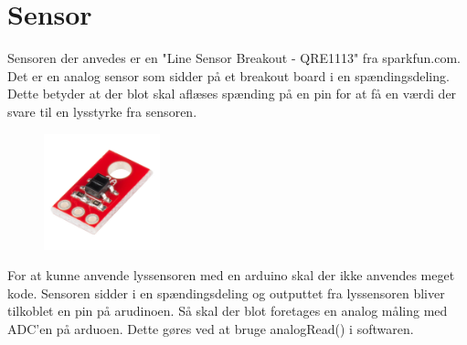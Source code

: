 \section{Sensor}
Sensoren der anvedes er en "Line Sensor Breakout - QRE1113" fra sparkfun.com. Det er en analog sensor som sidder på et breakout board i en spændingsdeling. Dette betyder at der blot skal aflæses spænding på en pin for at få en værdi der svare til en lysstyrke fra sensoren.

\begin{figure}[h!]
  \centering
  \includegraphics[width=0.3\textwidth]{figures/lyssensor.png}
\end{figure}

For at kunne anvende lyssensoren med en arduino skal der ikke anvendes meget kode. Sensoren sidder i en spændingsdeling og outputtet fra lyssensoren bliver tilkoblet en pin på arudinoen. Så skal der blot foretages en analog måling med ADC'en på arduoen. 
Dette gøres ved at bruge analogRead() i softwaren.